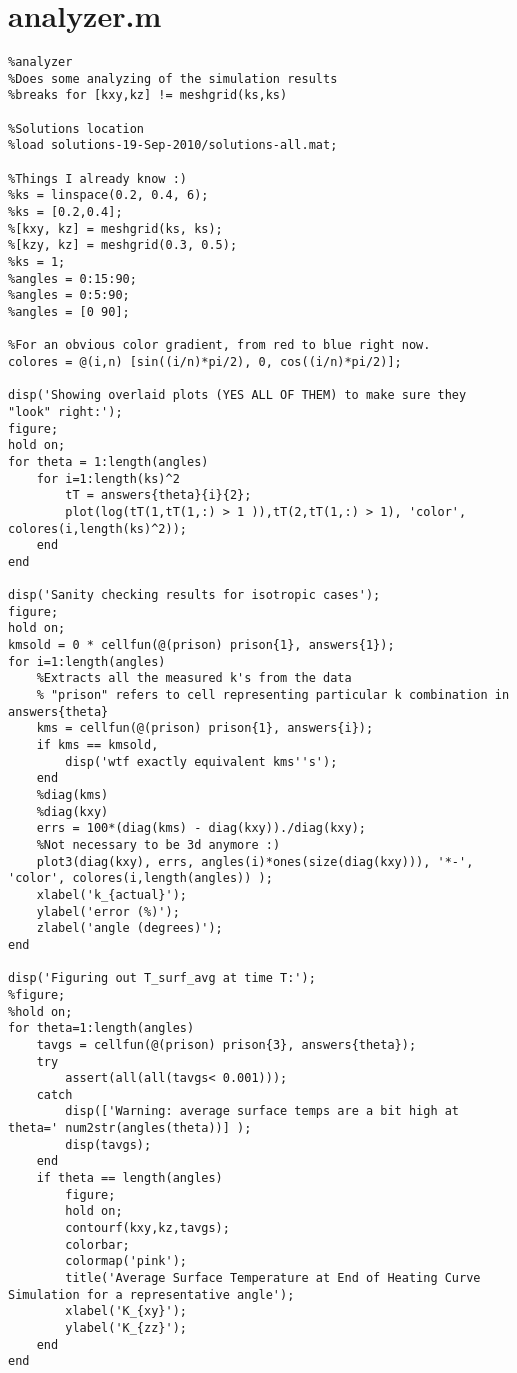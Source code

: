\section{analyzer.m}
\small
\begin{verbatim}
%analyzer
%Does some analyzing of the simulation results
%breaks for [kxy,kz] != meshgrid(ks,ks)

%Solutions location
%load solutions-19-Sep-2010/solutions-all.mat;

%Things I already know :)
%ks = linspace(0.2, 0.4, 6);
%ks = [0.2,0.4];
%[kxy, kz] = meshgrid(ks, ks);
%[kzy, kz] = meshgrid(0.3, 0.5);
%ks = 1;
%angles = 0:15:90;
%angles = 0:5:90;
%angles = [0 90];

%For an obvious color gradient, from red to blue right now.
colores = @(i,n) [sin((i/n)*pi/2), 0, cos((i/n)*pi/2)];

disp('Showing overlaid plots (YES ALL OF THEM) to make sure they "look" right:');
figure;
hold on;
for theta = 1:length(angles)
    for i=1:length(ks)^2
        tT = answers{theta}{i}{2};
        plot(log(tT(1,tT(1,:) > 1 )),tT(2,tT(1,:) > 1), 'color', colores(i,length(ks)^2));
    end
end

disp('Sanity checking results for isotropic cases');
figure;
hold on;
kmsold = 0 * cellfun(@(prison) prison{1}, answers{1});
for i=1:length(angles)
    %Extracts all the measured k's from the data
    % "prison" refers to cell representing particular k combination in answers{theta}
    kms = cellfun(@(prison) prison{1}, answers{i});
    if kms == kmsold,
        disp('wtf exactly equivalent kms''s');
    end
    %diag(kms)
    %diag(kxy)
    errs = 100*(diag(kms) - diag(kxy))./diag(kxy);
    %Not necessary to be 3d anymore :)
    plot3(diag(kxy), errs, angles(i)*ones(size(diag(kxy))), '*-', 'color', colores(i,length(angles)) );
    xlabel('k_{actual}');
    ylabel('error (%)');
    zlabel('angle (degrees)');
end

disp('Figuring out T_surf_avg at time T:');
%figure;
%hold on;
for theta=1:length(angles)
    tavgs = cellfun(@(prison) prison{3}, answers{theta});
    try
        assert(all(all(tavgs< 0.001)));
    catch
        disp(['Warning: average surface temps are a bit high at theta=' num2str(angles(theta))] );
        disp(tavgs);
    end
    if theta == length(angles)
        figure;
        hold on;
        contourf(kxy,kz,tavgs);
        colorbar;
        colormap('pink');
        title('Average Surface Temperature at End of Heating Curve Simulation for a representative angle');
        xlabel('K_{xy}');
        ylabel('K_{zz}');
    end
end


\end{verbatim}
